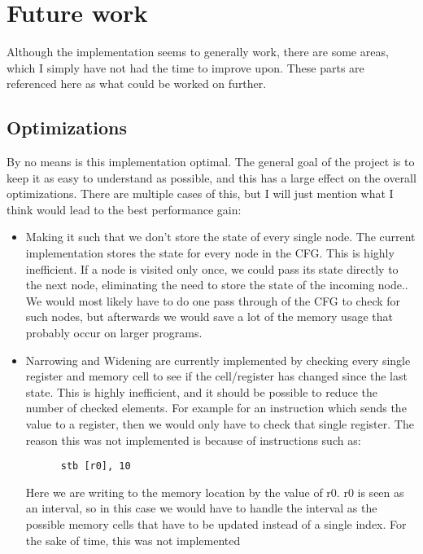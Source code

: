 \section{Future work}
Although the implementation seems to generally work, there are some areas,
which I simply have not had the time to improve upon. These parts are
referenced here as what could be worked on further.

\subsection{Optimizations}
By no means is this implementation optimal. The general goal of the project is
to keep it as easy to understand as possible, and this has a large effect on
the overall optimizations. There are multiple cases of this, but I will just
mention what I think would lead to the best performance gain:

\begin{itemize}
  \item Making it such that we don't store the state of every single node. The
    current implementation stores the state for every node in the CFG. This is
    highly inefficient. If a node is visited only once, we could pass its state
    directly to the next node, eliminating the need to store the state of the
    incoming node.. We would most likely have to do one pass through of the CFG
    to check for such nodes, but afterwards we would save a lot of the memory
    usage that probably occur on larger programs.
  \item Narrowing and Widening are currently implemented by checking every
    single register and memory cell to see if the cell/register has changed
    since the last state. This is highly inefficient, and it should be possible
    to reduce the number of checked elements. For example for an instruction
    which sends the value to a register, then we would only have to check that
    single register. The reason this was not implemented is because of instructions such as:
    \begin{verbatim}
      stb [r0], 10
    \end{verbatim}
    Here we are writing to the memory location by the value of r0. r0 is seen
    as an interval, so in this case we would have to handle the interval as the
    possible memory cells that have to be updated instead of a single index.
    For the sake of time, this was not implemented
\end{itemize}



